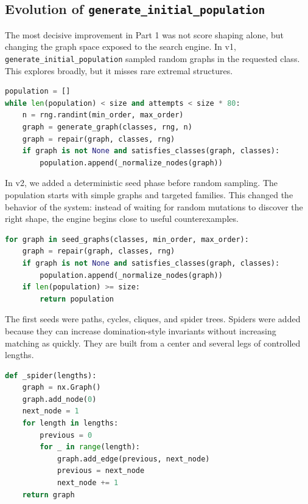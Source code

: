 \documentclass[11pt,a4paper]{article}
\begin{document}
\subsection{Evolution of \texttt{generate\_initial\_population}}

The most decisive improvement in Part 1 was not score shaping alone, but changing the graph space exposed to the search engine. In v1, \texttt{generate\_initial\_population} sampled random graphs in the requested class. This explores broadly, but it misses rare extremal structures.

\begin{lstlisting}[language=Python,caption={v1: repaired random population.}]
population = []
while len(population) < size and attempts < size * 80:
    n = rng.randint(min_order, max_order)
    graph = generate_graph(classes, rng, n)
    graph = repair(graph, classes, rng)
    if graph is not None and satisfies_classes(graph, classes):
        population.append(_normalize_nodes(graph))
\end{lstlisting}

In v2, we added a deterministic seed phase before random sampling. The population starts with simple graphs and targeted families. This changed the behavior of the system: instead of waiting for random mutations to discover the right shape, the engine begins close to useful counterexamples.

\begin{lstlisting}[language=Python,caption={v2 and later: structural seeds before randomness.}]
for graph in seed_graphs(classes, min_order, max_order):
    graph = repair(graph, classes, rng)
    if graph is not None and satisfies_classes(graph, classes):
        population.append(_normalize_nodes(graph))
    if len(population) >= size:
        return population
\end{lstlisting}

The first seeds were paths, cycles, cliques, and spider trees. Spiders were added because they can increase domination-style invariants without increasing matching as quickly. They are built from a center and several legs of controlled lengths.

\begin{lstlisting}[language=Python,caption={Spider seeds introduced in v2.}]
def _spider(lengths):
    graph = nx.Graph()
    graph.add_node(0)
    next_node = 1
    for length in lengths:
        previous = 0
        for _ in range(length):
            graph.add_edge(previous, next_node)
            previous = next_node
            next_node += 1
    return graph
\end{lstlisting}
\end{document}

